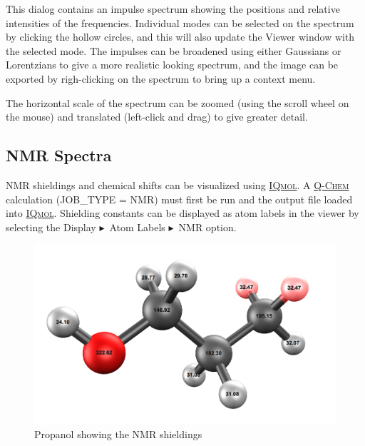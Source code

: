\documentclass[a4paper,12pt]{article}
\newcommand{\qchem}{\href{http://q-chem.com}{{\scshape Q-Chem}}}
\newcommand{\iqmol}{\href{http://iqmol.org}{{\scshape IQmol}}}
\newcommand{\bt}{\ensuremath{\blacktriangleright}}
\begin{document}
This dialog contains an impulse spectrum showing the positions and relative
intensities of the frequencies.  Individual modes can be selected on the
spectrum by clicking the hollow circles, and this will also update the Viewer
window with the selected mode.  The impulses can be broadened using either
Gaussians or Lorentzians to give a more realistic looking spectrum, and the
image can be exported by righ-clicking on the spectrum to bring up a context
menu.

The horizontal scale of the spectrum can be zoomed (using the scroll wheel on
the mouse) and translated (left-click and drag) to give greater detail.


\subsection{NMR Spectra}

NMR shieldings and chemical shifts can be visualized using \iqmol{}.  A 
\qchem{} calculation (JOB\_TYPE = NMR) must first be run and the output
file loaded into \iqmol{}.  Shielding constants can be displayed as atom labels
in the viewer by selecting the Display \bt\ Atom Labels \bt\ NMR option.
\begin{figure}[h]
\begin{center}
\includegraphics[scale=0.20]{figures/NmrDisplay.png}
\caption{Propanol showing the NMR shieldings}
\end{center}
\end{figure}
\end{document}
